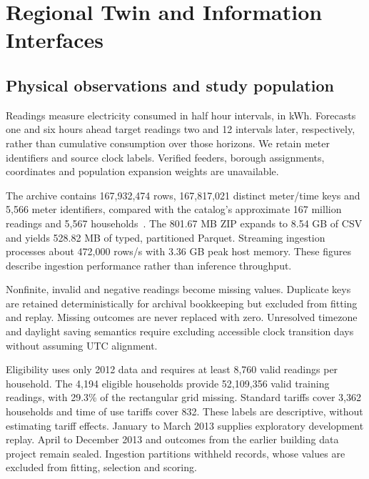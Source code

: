 \documentclass[conference]{IEEEtran}
\begin{document}
\section{Regional Twin and Information Interfaces}
\subsection{Physical observations and study population}
Readings measure electricity consumed in half hour intervals, in kWh. Forecasts one and six hours ahead target readings two and 12 intervals later, respectively, rather than cumulative consumption over those horizons. We retain meter identifiers and source clock labels. Verified feeders, borough assignments, coordinates and population expansion weights are unavailable.

The archive contains 167,932,474 rows, 167,817,021 distinct meter/time keys and 5,566 meter identifiers, compared with the catalog's approximate 167 million readings and 5,567 households~\cite{london}. The 801.67 MB ZIP expands to 8.54 GB of CSV and yields 528.82 MB of typed, partitioned Parquet. Streaming ingestion processes about 472,000 rows/s with 3.36 GB peak host memory. These figures describe ingestion performance rather than inference throughput.

Nonfinite, invalid and negative readings become missing values. Duplicate keys are retained deterministically for archival bookkeeping but excluded from fitting and replay. Missing outcomes are never replaced with zero. Unresolved timezone and daylight saving semantics require excluding accessible clock transition days without assuming UTC alignment.

Eligibility uses only 2012 data and requires at least 8,760 valid readings per household. The 4,194 eligible households provide 52,109,356 valid training readings, with 29.3\% of the rectangular grid missing. Standard tariffs cover 3,362 households and time of use tariffs cover 832. These labels are descriptive, without estimating tariff effects. January to March 2013 supplies exploratory development replay. April to December 2013 and outcomes from the earlier building data project remain sealed. Ingestion partitions withheld records, whose values are excluded from fitting, selection and scoring.
\end{document}
